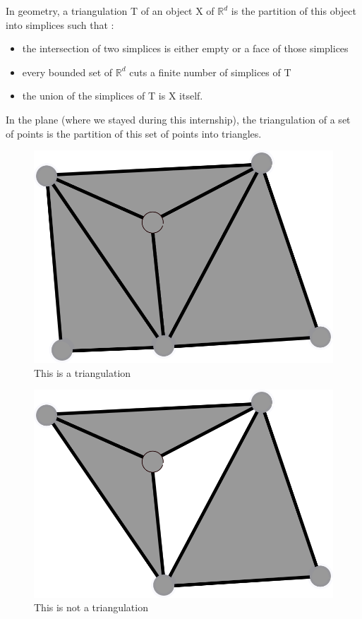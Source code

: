 \documentclass[a4paper,10pt]{article}
\begin{document}
In geometry, a triangulation T of an object X of $\mathbb{R}^d$ is the partition of this object into simplices such that :
\begin{itemize}
\item the intersection of two simplices is either empty or a face of those simplices
\item every bounded set of $\mathbb{R}^{d}$ cuts a finite number of simplices of T
  \item the union of the simplices of T is X itself.
\end{itemize}

In the plane (where we stayed during this internship), the triangulation of a set of points is the partition of this set of points into triangles.\\

\begin{figure}
  \centering
  \caption{\label{Trig1} This is a triangulation}
  \includegraphics[scale=2]{Trig1}
\end{figure}

\begin{figure}
  \centering
  \caption{\label{NotTrig1} This is not a triangulation}
  \includegraphics[scale=2]{NotTrig1}
\end{figure}
\end{document}
